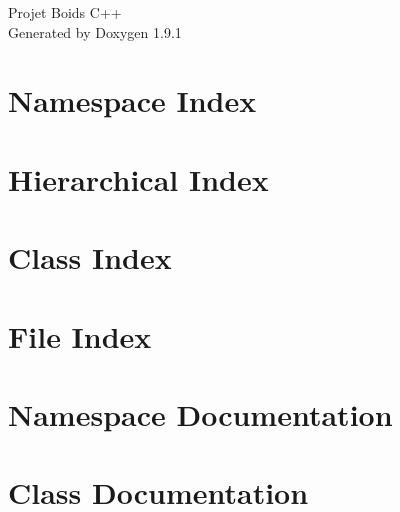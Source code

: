 \let\mypdfximage\pdfximage\def\pdfximage{\immediate\mypdfximage}\documentclass[twoside]{book}
\newcommand{\+}{\discretionary{\mbox{\scriptsize$\hookleftarrow$}}{}{}}
\newcommand{\clearemptydoublepage}{%
  \newpage{\pagestyle{empty}\cleardoublepage}%
}
\begin{document}
\raggedbottom

\hypersetup{pageanchor=false,
             bookmarksnumbered=true,
             pdfencoding=unicode
            }
\begin{titlepage}
\vspace*{7cm}
\begin{center}%
{\Large Projet Boids C++ }\\
\vspace*{1cm}
{\large Generated by Doxygen 1.9.1}\\
\end{center}
\end{titlepage}
\clearemptydoublepage
{}
\tableofcontents
\clearemptydoublepage
{}
\hypersetup{pageanchor=true}

\chapter{Namespace Index}

\chapter{Hierarchical Index}

\chapter{Class Index}

\chapter{File Index}

\chapter{Namespace Documentation}

\chapter{Class Documentation}















\end{document}
